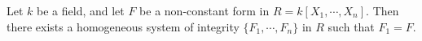 Let $k$ be a field, and let $F$ be a non-constant form in $R = k[X_1, \cdots, X_n]$. Then there exists a homogeneous system of integrity $\{F_1, \cdots, F_n\}$ in $R$ such that $F_1 = F$.